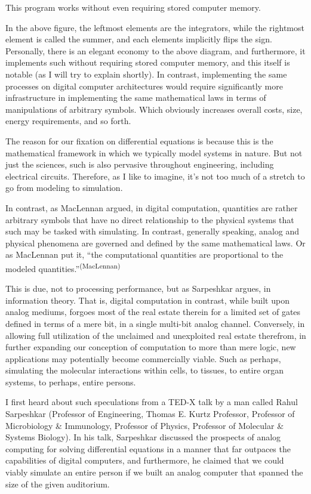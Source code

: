 This program works without even requiring stored computer memory.

In the above figure, the leftmost elements are the integrators, while the rightmost element is called the summer, and each elements implicitly flips the sign. Personally, there is an elegant economy to the above diagram, and furthermore, it implements such without requiring stored computer memory, and this itself is notable (as I will try to explain shortly). In contrast, implementing the same processes on digital computer architectures would require significantly more infrastructure in implementing the same mathematical laws in terms of manipulations of arbitrary symbols. Which obviously increases overall costs, size, energy requirements, and so forth.

The reason for our fixation on differential equations is because this is the mathematical framework in which we typically model systems in nature. But not just the sciences, such is also pervasive throughout engineering, including electrical circuits. Therefore, as I like to imagine, it's not too much of a stretch to go from modeling to simulation.

In contrast, as MacLennan argued, in digital computation, quantities are rather arbitrary symbols that have no direct relationship to the physical systems that such may be tasked with simulating. In contrast, generally speaking, analog and physical phenomena are governed and defined by the same mathematical laws. Or as MacLennan put it, ``the computational quantities are proportional to the modeled quantities.''\textsuperscript{(MacLennan)}

This is due, not to processing performance, but as Sarpeshkar argues, in information theory. That is, digital computation in contrast, while built upon analog mediums, forgoes most of the real estate therein for a limited set of gates defined in terms of a mere bit, in a single multi-bit analog channel. Conversely, in allowing full utilization of the unclaimed and unexploited real estate therefrom, in further expanding our conception of computation to more than mere logic, new applications may potentially become commercially viable. Such as perhaps, simulating the molecular interactions within cells, to tissues, to entire organ systems, to perhaps, entire persons.

I first heard about such speculations from a TED-X talk by a man called Rahul Sarpeshkar (Professor of Engineering, Thomas E. Kurtz Professor, Professor of Microbiology \& Immunology, Professor of Physics, Professor of Molecular \& Systems Biology). In his talk, Sarpeshkar discussed the prospects of analog computing for solving differential equations in a manner that far outpaces the capabilities of digital computers, and furthermore, he claimed that we could viably simulate an entire person if we built an analog computer that spanned the size of the given auditorium.

